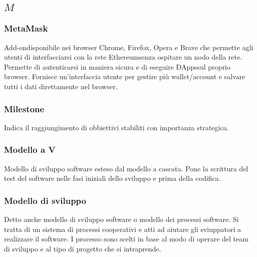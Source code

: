 \subsection*{\quad$M\quad$}
\subsubsection*{MetaMask}
Add-on\glosp disponibile nei browser Chrome, Firefox, Opera e Brave che permette agli utenti di interfacciarsi con la rete Ethereum\glosp senza ospitare un nodo della rete. Permette di autenticarsi in maniera sicura e di eseguire ÐApps\glosp sul proprio browser. Fornisce un'interfaccia utente per gestire più wallet/account e salvare tutti i dati direttamente nel browser. 

\subsubsection*{Milestone}
Indica il raggiungimento di obbiettivi stabiliti con importanza strategica. 

\subsubsection*{Modello a V}
Modello di sviluppo software esteso dal modello a cascata. Pone la scrittura del test del software nelle fasi iniziali dello sviluppo e prima della codifica.

\subsubsection*{Modello di sviluppo}
Detto anche modello di sviluppo software o modello dei processi software. Si tratta di un sistema di processi cooperativi e atti ad aiutare gli sviuppatori a realizzare il software. I processo sono scelti in base al modo di operare del team di sviluppo e al tipo di progetto che si intraprende.

